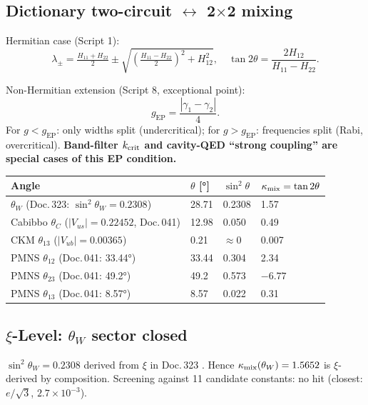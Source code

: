 \subsection{Dictionary two-circuit $\leftrightarrow$ 2$\times$2 mixing \B}

Hermitian case (Script 1):
\begin{equation}
  \lambda_\pm = \tfrac{H_{11}+H_{22}}{2} \pm
  \sqrt{\!\left(\tfrac{H_{11}-H_{22}}{2}\right)^2+H_{12}^2},\quad
  \tan 2\theta = \frac{2H_{12}}{H_{11}-H_{22}}.
\end{equation}

Non-Hermitian extension (Script 8, exceptional point):
\begin{equation}
  g_{\mathrm{EP}} = \frac{|\gamma_1-\gamma_2|}{4}.
\end{equation}
For $g<g_{\mathrm{EP}}$: only widths split (undercritical);
for $g>g_{\mathrm{EP}}$: frequencies split (Rabi, overcritical).
\textbf{Band-filter $k_{\mathrm{crit}}$ and cavity-QED ``strong coupling'' are special cases of
this EP condition.} \B

\begin{center}
\small
\begin{tabular}{llll}
\toprule
\textbf{Angle} & $\theta$ [°] & $\sin^2\!\theta$ & $\kappa_{\mathrm{mix}} = \tan 2\theta$\\
\midrule
$\theta_W$ (Doc.\,323: $\sin^2\theta_W=0.2308$) & 28.71 & 0.2308 & 1.57\\
Cabibbo $\theta_C$ ($|V_{us}|=0.22452$, Doc.\,041) & 12.98 & 0.050 & 0.49\\
CKM $\theta_{13}$ ($|V_{ub}|=0.00365$) & 0.21 & $\approx0$ & 0.007\\
PMNS $\theta_{12}$ (Doc.\,041: 33.44°) & 33.44 & 0.304 & 2.34\\
PMNS $\theta_{23}$ (Doc.\,041: 49.2°) & 49.2 & 0.573 & $-6.77$\\
PMNS $\theta_{13}$ (Doc.\,041: 8.57°) & 8.57 & 0.022 & 0.31\\
\bottomrule
\end{tabular}
\end{center}

\subsection{$\xi$-Level: $\theta_W$ sector closed \K}

$\sin^2\theta_W=0.2308$ derived from $\xi$ in Doc.\,323 \K. Hence
$\kappa_{\mathrm{mix}}(\theta_W)=1.5652$ is $\xi$-derived by composition. Screening against 11
candidate constants: no hit (closest: $e/\!\sqrt{3}$, $2.7\times10^{-3}$).


